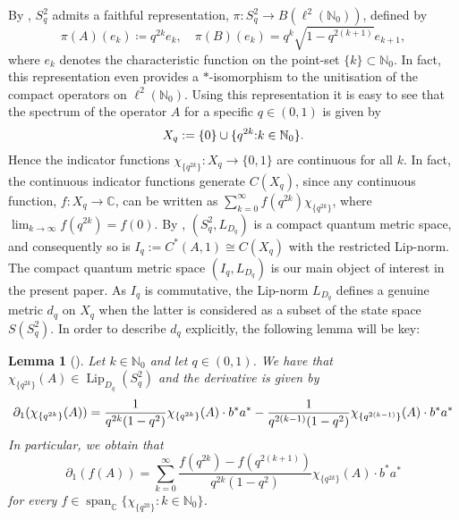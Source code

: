 \documentclass[11pt, reqno, a4paper, final]{amsart}
\theoremstyle{plain}
\newtheorem{lemma}[thm]{Lemma}
\theoremstyle{definition}
\newcommand{\NN}{{\mathbb N}}
\newcommand{\CC}{{\mathbb C}}
\newcommand{\Lip}{\operatorname{Lip}}
\newcommand{\black}{\color{black}}
\begin{document}
By \cite[Proposition 4]{Podles}, $S_q^2$ admits a faithful representation, $\pi\colon S_q^2 \to B(\ell^2(\NN_0))$, defined by
\begin{equation}
\label{Eq:PodRep} \pi(A)(e_k)\coloneqq q^{2k}e_k, \quad  \pi(B)(e_k)=q^k \sqrt{1-q^{2(k+1)}}e_{k+1},
\end{equation}
where $e_k$ denotes the characteristic function on the point-set $\lbrace	k\rbrace\subset\NN_0$. In fact, this representation even provides a $*$-isomorphism to the unitisation of the {\black compact operators on $\ell^2(\NN_0)$}.
Using this representation it is easy to see that the spectrum of the operator $A$ for a specific $q\in(0,1)$ is given by $$X_q:=\lbrace 0 \rbrace  \cup \lbrace q^{2k} {\black :} k \in \NN_0\rbrace.$$
Hence the indicator functions $\chi_{\lbrace q^{2k} \rbrace} \colon X_q\to \lbrace 0,1\rbrace$ are continuous for all $k$. In fact, the continuous indicator functions generate $C(X_q)$, since any continuous function, {\black $f \colon X_q \to \CC$}, can be written as $\sum_{k=0}^\infty  f(q^{2k}) \chi_{\lbrace q^{2k}\rbrace}$, {\black where $\lim_{k \to \infty} f(q^{2k}) = f(0)$}.
By \cite[Theorem 8.3]{Kaad-Aguilar}, {\black $(S_q^2,L_{D_q})$} is a compact quantum metric space, and consequently so is $I_q:=C^*(A,1)\cong C(X_q)$ with the restricted Lip-norm. {\black The compact quantum metric space $(I_q,L_{D_q})$ is our main object of interest in the present paper}.  As $I_q$ is commutative, the Lip-norm {\black $L_{D_q}$} defines a genuine metric $d_q$ on $X_q$ when the latter is considered as a subset of the state space $S(S_q^2)$. In order to describe $d_q$ explicitly, the following lemma will be key:
\begin{lemma}[{\cite[Lemma 5.3]{Kaad-Aguilar}}]
\label{Lemma:Char}
Let $k\in \NN_0$ {\black and let $q \in (0,1)$}. We have that $\chi_{\lbrace q^{2k}\rbrace}(A) \in \Lip_{D_q}(S_q^2)$ and the derivative is given by
\begin{align*}
{\black \partial_1(\chi_{\lbrace q^{2k} \rbrace}(A))=
\frac{1}{q^{2k}(1-q^2)}\chi_{\lbrace q^{2k}\rbrace}(A)\cdot b^*a^*
-\frac{1}{q^{2(k-1)}(1-q^2)}\chi_{\lbrace q^{2(k-1)}\rbrace}(A)\cdot b^*a^* } %
\end{align*}
{\black In particular, we obtain that 
\begin{equation}\label{eq:qdiff}
\partial_1(f(A)) = \sum_{k = 0}^\infty \frac{f(q^{2k}) - f(q^{2(k+1)})}{q^{2k}(1-q^2)} \chi_{\lbrace q^{2k}\rbrace}(A)\cdot b^* a^* 
\end{equation}
for every $f \in \operatorname{span}_\CC\{\chi_{\lbrace q^{2k}\rbrace} : k\in \NN_0\}$.}
\end{lemma}
\end{document}
